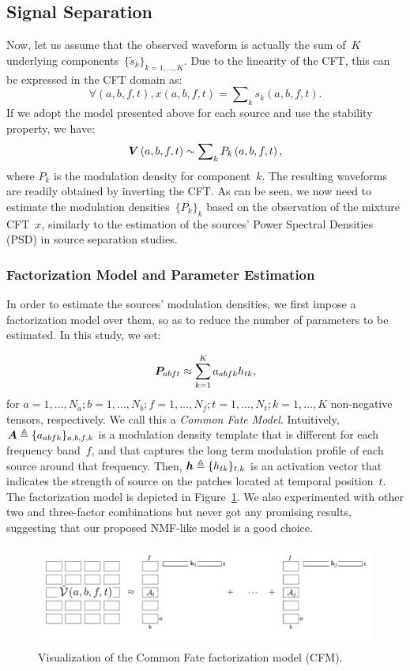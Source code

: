 \subsection{Signal Separation}
Now, let us assume that the observed waveform is actually the sum of~$K$ underlying components~$\{ \tilde{s}_{k}\} _{k=1,\dots,K}$.
Due to the linearity of the CFT, this can be expressed in the CFT domain as:
$$
\forall\left(a,b,f,t\right),x\left(a,b,f,t\right)=\sum\nolimits_{k}s_{k}\left(a,b,f,t\right).
$$
If we adopt the model presented above for each source and use the stability property, we have:
$$
{\bm{V}}\left(a,b,f,t\right)\sim \sum\nolimits_{k}P_{k}\left(a,b,f,t\right),
$$
where $P_{k}$ is the modulation density for component~$k$.
The resulting waveforms are readily obtained by inverting the CFT.\@
As can be seen, we now need to estimate the modulation densities~$\{ P_{k}\}_{k}$ based on the observation of the mixture CFT~$x$, similarly to the estimation of the sources' Power Spectral Densities (PSD)
in source separation studies.

\subsubsection{Factorization Model and Parameter Estimation}
\label{sub:NTF}

In order to estimate the sources' modulation densities, we first impose a factorization model over them, so as to reduce the number of parameters to be estimated. 
In this study, we set:

\begin{equation}
{\bm{P}}_{abft} \approx \sum_{k=1}^{K}a_{abfk}h_{tk},\label{eq:NTF_model}
\end{equation}
for $a=1,\ldots,N_a;b=1,\ldots,N_b;f=1,\ldots,N_f;t=1,\ldots,N_t;k=1,\ldots,K$ non-negative tensors, respectively. 
We call this a \emph{Common Fate Model}. 
Intuitively, ${\bm{A}} \triangleq \{a_{abfk}\}_{a,b,f,k}$ is a modulation density template that is different for each frequency band~$f$, and that captures the long term modulation profile of each source around that frequency.
Then, ${\bm{h}} \triangleq \{h_{tk}\}_{t,k}$ is an activation vector that indicates the strength of source on the patches located at temporal position~$t$.
The factorization model is depicted in Figure~\ref{fig:cfm}.
We also experimented with other two and three-factor combinations but never got any promising results, suggesting that our proposed NMF-like model is a good choice.

\begin{figure}[!htbp]
\centering
\includegraphics[width=0.9\columnwidth]{Chapters/06_Separation_Unknown/figures/cfm.pdf}
\caption{Visualization of the Common Fate factorization model (CFM).}
\label{fig:cfm}
\end{figure}

